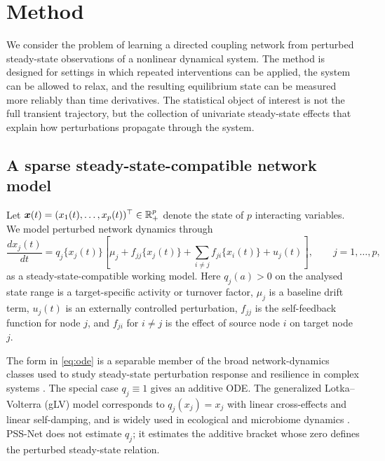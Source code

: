 \section{Method}
\label{sec:method}

We consider the problem of learning a directed coupling network from perturbed
steady-state observations of a nonlinear dynamical system.  The method is
designed for settings in which repeated interventions can be applied, the system
can be allowed to relax, and the resulting equilibrium state can be measured
more reliably than time derivatives.  The statistical object of interest is not
the full transient trajectory, but the collection of univariate steady-state
effects that explain how perturbations propagate through the system.

\subsection{A sparse steady-state-compatible network model}
\label{sec:method:model}

Let $\bm{x}(t)=(x_1(t),\ldots,x_p(t))^\top\in\mathbb{R}_+^p$ denote the state of $p$
interacting variables.  We model perturbed network dynamics through
\begin{equation}
  \frac{d x_j(t)}{dt}
  =
  q_j\{x_j(t)\}
  \left[
  \mu_j
  + f_{jj}\{x_j(t)\}
  + \sum_{i\neq j} f_{ji}\{x_i(t)\}
  + u_j(t)
  \right],
  \qquad j=1,\ldots,p,
  \label{eq:ode}
\end{equation}
as a steady-state-compatible working model.  Here $q_j(a)>0$ on the analysed
state range is a target-specific activity or turnover factor, $\mu_j$ is a
baseline drift term, $u_j(t)$ is an externally controlled perturbation, $f_{jj}$
is the self-feedback function for node $j$, and $f_{ji}$ for $i\neq j$ is the
effect of source node $i$ on target node $j$.

The form in \eqref{eq:ode} is a separable member of the broad network-dynamics
classes used to study steady-state perturbation response and resilience in
complex systems \citep{barzel2013universality,gao2016universal}.  The special
case $q_j\equiv 1$ gives an additive ODE.  The generalized Lotka--Volterra
(gLV) model corresponds to $q_j(x_j)=x_j$ with linear cross-effects and linear
self-damping, and is widely used in ecological and microbiome dynamics
\citep{stein2013ecological,venturelli2018deciphering}.  PSS-Net does not
estimate $q_j$; it estimates the additive bracket whose zero defines the
perturbed steady-state relation.

